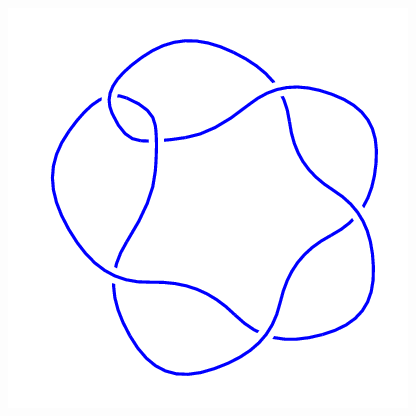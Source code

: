 \begin{figure}[H]
\begin{minipage}[b]{.18\linewidth}
	\end{minipage}
	\begin{minipage}[b]{.18\linewidth}
		\centering
		\includegraphics[width=\linewidth]{../data/6_1.png}
	\end{minipage}
\end{figure}
